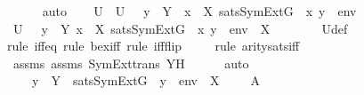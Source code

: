 \begin{isabellebody}
\ \ \ \ \isamarkupfalse%
\ auto\isanewline
\isanewline
\ \ \isamarkupfalse%
\ U\ \ {\isachardoublequoteopen}U\ {\isasymequiv}\ {\isacharbraceleft}{\kern0pt}\ y\ {\isasymin}\ Y\ {\isachardot}{\kern0pt}\ {\isasymexists}x\ {\isasymin}\ X{\isachardot}{\kern0pt}\ sats{\isacharparenleft}{\kern0pt}SymExt{\isacharparenleft}{\kern0pt}G{\isacharparenright}{\kern0pt}{\isacharcomma}{\kern0pt}\ {\isasymphi}{\isacharcomma}{\kern0pt}\ {\isacharbrackleft}{\kern0pt}x{\isacharcomma}{\kern0pt}\ y{\isacharbrackright}{\kern0pt}\ {\isacharat}{\kern0pt}\ env{\isacharparenright}{\kern0pt}\ {\isacharbraceright}{\kern0pt}{\isachardoublequoteclose}\ \isanewline
\isanewline
\ \ \isamarkupfalse%
\ {\isachardoublequoteopen}U\ {\isacharequal}{\kern0pt}\ {\isacharbraceleft}{\kern0pt}\ y\ {\isasymin}\ Y{\isachardot}{\kern0pt}\ {\isasymexists}x\ {\isasymin}\ X{\isachardot}{\kern0pt}\ sats{\isacharparenleft}{\kern0pt}SymExt{\isacharparenleft}{\kern0pt}G{\isacharparenright}{\kern0pt}{\isacharcomma}{\kern0pt}\ {\isasymphi}{\isacharcomma}{\kern0pt}\ {\isacharparenleft}{\kern0pt}{\isacharbrackleft}{\kern0pt}x{\isacharcomma}{\kern0pt}\ y{\isacharbrackright}{\kern0pt}\ {\isacharat}{\kern0pt}\ env{\isacharparenright}{\kern0pt}\ {\isacharat}{\kern0pt}\ {\isacharbrackleft}{\kern0pt}X{\isacharbrackright}{\kern0pt}{\isacharparenright}{\kern0pt}\ {\isacharbraceright}{\kern0pt}{\isachardoublequoteclose}\ \isanewline
\ \ \ \ \isamarkupfalse%
\ U{\isacharunderscore}{\kern0pt}def\ \isanewline
\ \ \ \ \isamarkupfalse%
{\isacharparenleft}{\kern0pt}rule\ iff{\isacharunderscore}{\kern0pt}eq{\isacharcomma}{\kern0pt}\ rule\ bex{\isacharunderscore}{\kern0pt}iff{\isacharcomma}{\kern0pt}\ rule\ iff{\isacharunderscore}{\kern0pt}flip{\isacharparenright}{\kern0pt}\isanewline
\ \ \ \ \isamarkupfalse%
{\isacharparenleft}{\kern0pt}rule\ arity{\isacharunderscore}{\kern0pt}sats{\isacharunderscore}{\kern0pt}iff{\isacharparenright}{\kern0pt}\isanewline
\ \ \ \ \isamarkupfalse%
\ assms\ assms{}\ SymExt{\isacharunderscore}{\kern0pt}trans\ YH\isanewline
\ \ \ \ \isamarkupfalse%
\ auto\ \isanewline
\ \ \isamarkupfalse%
\ \isamarkupfalse%
\ {\isachardoublequoteopen}{\isachardot}{\kern0pt}{\isachardot}{\kern0pt}{\isachardot}{\kern0pt}\ {\isacharequal}{\kern0pt}\ {\isacharbraceleft}{\kern0pt}\ y\ {\isasymin}\ Y\ {\isachardot}{\kern0pt}\ sats{\isacharparenleft}{\kern0pt}SymExt{\isacharparenleft}{\kern0pt}G{\isacharparenright}{\kern0pt}{\isacharcomma}{\kern0pt}\ {\isasympsi}{\isacharcomma}{\kern0pt}\ {\isacharbrackleft}{\kern0pt}y{\isacharbrackright}{\kern0pt}\ {\isacharat}{\kern0pt}\ env\ {\isacharat}{\kern0pt}\ {\isacharbrackleft}{\kern0pt}X{\isacharbrackright}{\kern0pt}{\isacharparenright}{\kern0pt}\ {\isacharbraceright}{\kern0pt}{\isachardoublequoteclose}\ {\isacharparenleft}{\kern0pt}\ {\isachardoublequoteopen}{\isacharunderscore}{\kern0pt}\ {\isacharequal}{\kern0pt}\ {\isacharquery}{\kern0pt}A{\isachardoublequoteclose}{\isacharparenright}{\kern0pt}\ \isanewline

\end{isabellebody}
